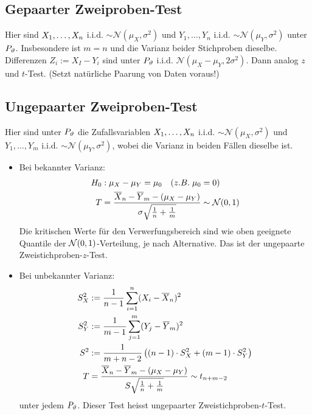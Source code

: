 \subsection*{Gepaarter Zweiproben-Test}
Hier sind $X_1, \dots, X_n$ i.i.d. $\sim \mathcal{N} (\mu_X, \sigma^2)$ und
$Y_1, \dots, Y_n$ i.i.d. $\sim \mathcal{N} (\mu_Y, \sigma^2)$ unter $P_\vartheta$.
Insbesondere ist $m = n$ und die Varianz beider Stichproben dieselbe.
Differenzen $Z_i := X_I - Y_i$ sind unter $P_\vartheta$ i.i.d. $\mathcal{N} (\mu_X -
  \mu_Y, 2 \sigma^2)$. Dann analog $z$ und $t$-Test. (Setzt natürliche Paarung
von Daten voraus!)
\subsection*{Ungepaarter Zweiproben-Test}
Hier sind unter $P_\vartheta$ die Zufallsvariablen $X_1, \dots, X_n$ i.i.d. $\sim
  \mathcal{N} (\mu_X, \sigma^2)$ und $Y_1, \dots, Y_m$ i.i.d. $\sim \mathcal{N}
  (\mu_Y, \sigma^2)$, wobei die Varianz in beiden Fällen dieselbe ist.
\begin{itemize}
  \item Bei bekannter Varianz:
        \begin{align*}
          H_0 & : \mu_X - \mu_Y = \mu_0 \quad  (z.B. \; \mu_0 = 0)                                                                                \\
          T   & = \frac{\overline{X}_n - \overline{Y}_m -  (\mu_X - \mu_Y)}{\sigma \sqrt{\frac{1}{n} + \frac{1}{m}}} \sim \mathcal{N} (0, 1)
        \end{align*}
        Die kritischen Werte für den Verwerfungsbereich sind wie oben
        geeignete Quantile der $\mathcal{N} (0, 1)$-Verteilung, je nach
        Alternative. Das ist der ungepaarte Zweistichproben-$z$-Test.

  \item Bei unbekannter Varianz:
        \begin{align*}
          S_X^2 & := \frac{1}{n-1} \sum_{i = 1}^n  (X_i - \overline{X}_n)^2                                                                 \\
          S_Y^2 & := \frac{1}{m-1} \sum_{j = 1}^m  (Y_j - \overline{Y}_m)^2                                                      \\
          S^2   & := \frac{1}{m+n-2} \left(  (n-1) \cdot S_X^2 +  (m-1) \cdot S_Y^2 \right)                                      \\
          T     & = \frac{\overline{X}_n - \overline{Y}_m -  (\mu_X - \mu_Y)}{S \sqrt{\frac{1}{n} + \frac{1}{m}}} \sim t_{n+m-2}
        \end{align*}
        unter jedem $P_\vartheta$. Dieser Test heisst ungepaarter Zweistichproben-$t$-Test.
\end{itemize}
